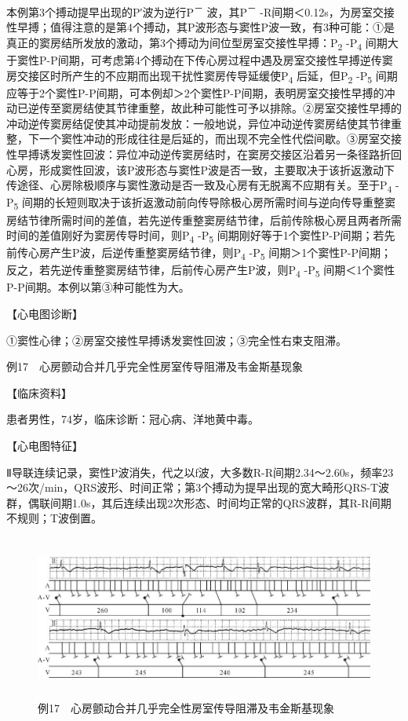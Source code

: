 本例第3个搏动提早出现的P′波为逆行P\textsuperscript{－}
波，其P\textsuperscript{－}
-R间期＜0.12s，为房室交接性早搏；值得注意的是第4个搏动，其P波形态与窦性P波一致，有3种可能：①是真正的窦房结所发放的激动，第3个搏动为间位型房室交接性早搏：P\textsubscript{2}
-P\textsubscript{4}
间期大于窦性P-P间期，可考虑第4个搏动在下传心房过程中遇及房室交接性早搏逆传窦房交接区时所产生的不应期而出现干扰性窦房传导延缓使P\textsubscript{4}
后延，但P\textsubscript{2} -P\textsubscript{5}
间期应等于2个窦性P-P间期，可本例却＞2个窦性P-P间期，表明房室交接性早搏的冲动已逆传至窦房结使其节律重整，故此种可能性可予以排除。②房室交接性早搏的冲动逆传窦房结促使其冲动提前发放：一般地说，异位冲动逆传窦房结使其节律重整，下一个窦性冲动的形成往往是后延的，而出现不完全性代偿间歇。③房室交接性早搏诱发窦性回波：异位冲动逆传窦房结时，在窦房交接区沿着另一条径路折回心房，形成窦性回波，该P波形态与窦性P波是否一致，主要取决于该折返激动下传途径、心房除极顺序与窦性激动是否一致及心房有无脱离不应期有关。至于P\textsubscript{4}
-P\textsubscript{5}
间期的长短则取决于该折返激动前向传导除极心房所需时间与逆向传导重整窦房结节律所需时间的差值，若先逆传重整窦房结节律，后前传除极心房且两者所需时间的差值刚好为窦房传导时间，则P\textsubscript{4}
-P\textsubscript{5}
间期刚好等于1个窦性P-P间期；若先前传心房产生P波，后逆传重整窦房结节律，则P\textsubscript{4}
-P\textsubscript{5}
间期＞1个窦性P-P间期；反之，若先逆传重整窦房结节律，后前传心房产生P波，则P\textsubscript{4}
-P\textsubscript{5} 间期＜1个窦性P-P间期。本例以第③种可能性为大。

【心电图诊断】

①窦性心律；②房室交接性早搏诱发窦性回波；③完全性右束支阻滞。

例17　心房颤动合并几乎完全性房室传导阻滞及韦金斯基现象

【临床资料】

患者男性，74岁，临床诊断：冠心病、洋地黄中毒。

【心电图特征】

Ⅱ导联连续记录，窦性P波消失，代之以f波，大多数R-R间期2.34～2.60s，频率23～26次/min，QRS波形、时间正常；第3个搏动为提早出现的宽大畸形QRS-T波群，偶联间期1.0s，其后连续出现2次形态、时间均正常的QRS波群，其R-R间期不规则；T波倒置。

\begin{figure}[!htbp]
 \centering
 \includegraphics[width=5.78125in,height=2.11458in]{./images/Image00775.jpg}
 \captionsetup{justification=centering}
 \caption{例17　心房颤动合并几乎完全性房室传导阻滞及韦金斯基现象}
 \label{fig50-17}
  \end{figure} 

